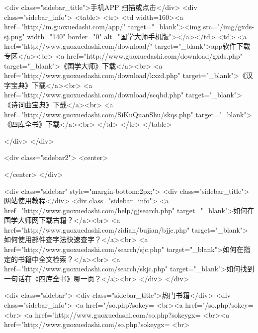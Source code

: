 <div class="sidebar_title">手机APP 扫描或点击</div>
<div class="sidebar_info">
<table>
<tr>
	<td width=160><a href="http://m.guoxuedashi.com/app/" target="_blank"><img src="/img/gxds-sj.png" width="140"  border="0" alt="国学大师手机版"></a></td>
	<td>
<a href="http://www.guoxuedashi.com/download/" target="_blank">app软件下载专区</a><br>
<a href="http://www.guoxuedashi.com/download/gxds.php" target="_blank">《国学大师》下载</a><br>
<a href="http://www.guoxuedashi.com/download/kxzd.php" target="_blank">《汉字宝典》下载</a><br>
<a href="http://www.guoxuedashi.com/download/scqbd.php" target="_blank">《诗词曲宝典》下载</a><br>
<a href="http://www.guoxuedashi.com/SiKuQuanShu/skqs.php" target="_blank">《四库全书》下载</a><br>
</td>
</tr>
</table>

</div>
</div>


<div class="sidebar2">
<center>


</center>
</div>

<div class="sidebar"  style="margin-bottom:2px;">
<div class="sidebar_title">网站使用教程</div>
<div class="sidebar_info">
<a href="http://www.guoxuedashi.com/help/gjsearch.php" target="_blank">如何在国学大师网下载古籍？</a><br>
<a href="http://www.guoxuedashi.com/zidian/bujian/bjjc.php" target="_blank">如何使用部件查字法快速查字？</a><br>
<a href="http://www.guoxuedashi.com/search/sjc.php" target="_blank">如何在指定的书籍中全文检索？</a><br>
<a href="http://www.guoxuedashi.com/search/skjc.php" target="_blank">如何找到一句话在《四库全书》哪一页？</a><br>
</div>
</div>


<div class="sidebar">
<div class="sidebar_title">热门书籍</div>
<div class="sidebar_info">
<a href="/so.php?sokey=%
<br><a href="/so.php?sokey=%
<br>
<a href="http://www.guoxuedashi.com/so.php?sokeygx=%
<br><a href="http://www.guoxuedashi.com/so.php?sokeygx=%
<br>

